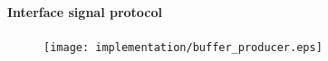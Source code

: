 \begin{frame}[fragile]
\begin{textblock*}{\displayThumbnail}
    \end{textblock*}
    \frametitle{\ImplementationTitle}
    \framesubtitle{Interface signal protocol}
        \begin{figure}
                \centering
                \texttt{[image: implementation/buffer\_producer.eps]}
       \end{figure}
\end{frame}





%
%
%
%
%
